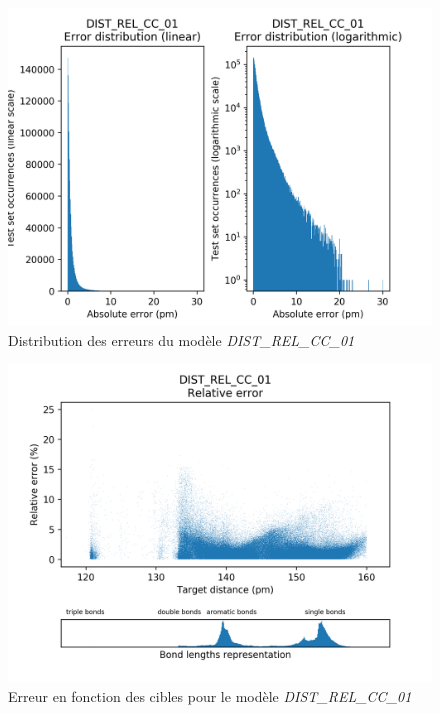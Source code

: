 \begin{figure}[!h]
	\centering
	
	\includegraphics[scale=0.8]{../figures/DIST_REL_CC_01/DIST_REL_CC_01_distrib_rmse_val.png}	
	
	\caption{Distribution des erreurs du modèle \emph{DIST\_REL\_CC\_01}}
\end{figure}
\begin{figure}[!h]
	\centering
	
	\includegraphics[scale=0.8]{../figures/DIST_REL_CC_01/DIST_REL_CC_01_distrib_rmse_dist.png}	
	
	\caption{Erreur en fonction des cibles pour le modèle \emph{DIST\_REL\_CC\_01}}
	\end{figure}

